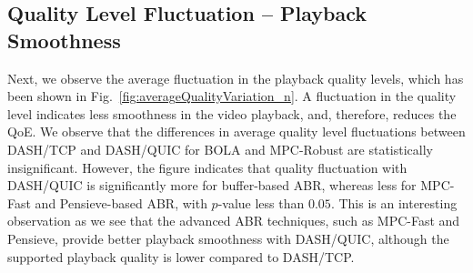 

\subsection{Quality Level Fluctuation -- Playback Smoothness}
Next, we observe the average fluctuation in the playback quality levels, which has been shown in Fig.~\ref{fig:averageQualityVariation_n}. A fluctuation in the quality level indicates less smoothness in the video playback, and, therefore, reduces the QoE. We observe that the differences in average quality level fluctuations between DASH/TCP and DASH/QUIC for BOLA and MPC-Robust are statistically insignificant. However, the figure indicates that quality fluctuation with DASH/QUIC is significantly more for buffer-based ABR, whereas less for MPC-Fast and Pensieve-based ABR, with $p$-value less than $0.05$. This is an interesting observation as we see that the advanced ABR techniques, such as MPC-Fast and Pensieve, provide better playback smoothness with DASH/QUIC, although the supported playback quality is lower compared to DASH/TCP. 

